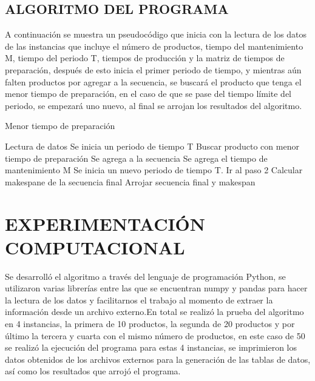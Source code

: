 \documentclass[twocolumn,10pt]{article}
\begin{document}
\subsection{ALGORITMO DEL PROGRAMA}
A continuación se muestra un pseudocódigo que inicia con la lectura de los datos de las instancias que incluye el número de productos, tiempo del mantenimiento M, tiempo del periodo T, tiempos de producción y la matriz de tiempos de preparación, después de esto inicia el primer periodo de tiempo, y mientras aún falten productos por agregar a la secuencia, se buscará el producto que tenga el menor tiempo de preparación, en el caso de que se pase del tiempo límite del periodo, se empezará uno nuevo, al final se arrojan los resultados del algoritmo.
\begin{algorithm}
\caption{Menor tiempo de preparación}\label{alg:cap}
\begin{algorithmic}
\State Lectura de datos
\State Se inicia un periodo de tiempo T
\State Buscar producto con menor tiempo de preparación
    	\State Se agrega a la secuencia
\Else{}
    	\State Se agrega el tiempo de mantenimiento M
    	\State Se inicia un nuevo periodo de tiempo T. 
	\State Ir al paso 2
\EndIf
\EndWhile
\State Calcular makespane de la secuencia final
\State Arrojar secuencia final y makespan
\end{algorithmic}
\end{algorithm}





\section{EXPERIMENTACIÓN \\COMPUTACIONAL}

Se desarrolló el algoritmo a través del lenguaje de programación Python, se utilizaron varias librerías entre las que se encuentran numpy y pandas para hacer la lectura de los datos y facilitarnos el trabajo al momento de extraer la información desde un archivo externo.En total se realizó la prueba del algoritmo en 4 instancias, la primera de 10 productos, la segunda de 20 productos y por último la tercera y cuarta con el mismo número de productos, en este caso de 50 se realizó la ejecución del programa para estas 4 instancias, se imprimieron los datos obtenidos de los archivos externos para la generación de las tablas de datos, así como los resultados que arrojó el programa.
 
\end{document}
